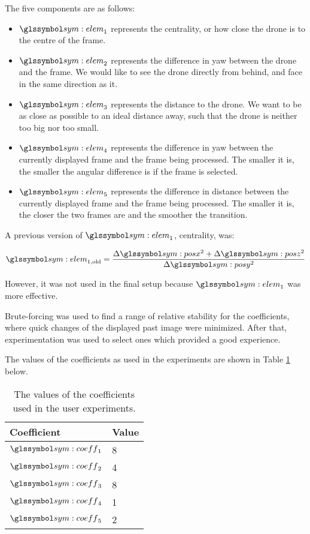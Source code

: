       The five components are as follows:

      \begin{itemize}
	\item $\sym{elem}_1$ represents the centrality, or how close the drone is to the centre of the frame.
	\item $\sym{elem}_2$ represents the difference in yaw between the drone and the frame.
	      We would like to see the drone directly from behind, and face in the same direction as it.
	\item $\sym{elem}_3$ represents the distance to the drone.
	      We want to be as close as possible to an ideal distance away, such that the drone is neither too big nor too small.
	\item $\sym{elem}_4$ represents the difference in yaw between the currently displayed frame and the frame being processed.
	      The smaller it is, the smaller the angular difference is if the frame is selected.
	\item $\sym{elem}_5$ represents the difference in distance between the currently displayed frame and the frame being processed.
	      The smaller it is, the closer the two frames are and the smoother the transition.
      \end{itemize}

      A previous version of $\sym{elem}_1$, centrality, was:

      \begin{equation}
	\sym{elem}_{1,\mathrm{old}} = \frac{\Delta\sym{posx}^2 + \Delta\sym{posz}^2}{\Delta\sym{posy}^2}
      \end{equation}

      However, it was not used in the final setup because $\sym{elem}_1$ was more effective.  %

      Brute-forcing was used to find a range of relative stability for the coefficients, where quick changes of the displayed past image were minimized.
      After that, experimentation was used to select ones which provided a good experience.  

      The values of the coefficients as used in the experiments are shown in Table \ref{tab:coeffs} below.

      \begin{table}[h]
	\centering
	\caption[Final coefficient values]{The values of the coefficients used in the user experiments.}
	\begin{tabular}{ll}
	  \toprule
	  Coefficient & Value \\
	  \midrule
	  $\sym{coeff}_1$ & 8 \\
	  $\sym{coeff}_2$ & 4 \\
	  $\sym{coeff}_3$ & 8 \\
	  $\sym{coeff}_4$ & 1 \\
	  $\sym{coeff}_5$ & 2 \\
	  \bottomrule
	\end{tabular}
	\label{tab:coeffs}
      \end{table}


